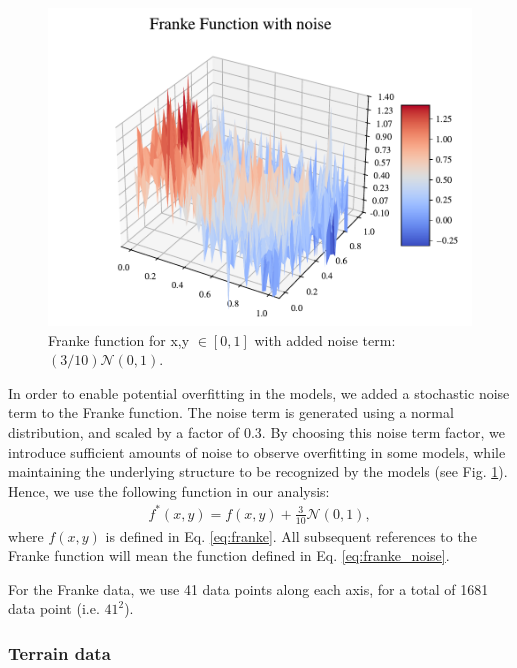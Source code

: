 \begin{figure}[h!]
\centering
\includegraphics[width=1\linewidth]{project_1/figures/figures_in_report/franke_func_noise.pdf}
\caption{Franke function for x,y $\in [0,1]$ with added noise term: $(3/10) \mathcal{N}(0, 1)$.}
\label{fig:franke_noise}
\end{figure}

In order to enable potential overfitting in the models, we added a stochastic noise term to the Franke function. The noise term is generated using a normal distribution, and scaled by a factor of $0.3$. By choosing this noise term factor, we introduce sufficient amounts of noise to observe overfitting in some models, while maintaining the underlying structure to be recognized by the models (see Fig. \ref{fig:franke_noise}). Hence, we use the following function in our analysis:
\begin{align}\label{eq:franke_noise}
    f^*(x,y) = f(x, y) + \frac{3}{10} \mathcal{N}(0, 1),
\end{align}
where $f(x,y)$ is defined in Eq. \ref{eq:franke}. All subsequent references to the Franke function will mean the function defined in Eq. \ref{eq:franke_noise}.

For the Franke data, we use 41 data points along each axis, for a total of 1681 data point (i.e. $41^2$).

\subsubsection{Terrain data}

